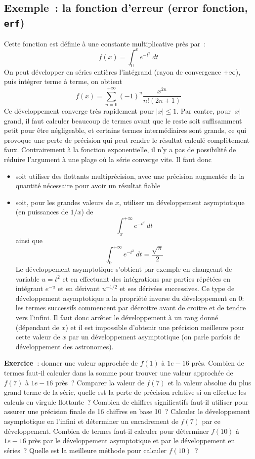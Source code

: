\documentclass[a4paper,11pt]{book}
\begin{document}
\begin{giacjshere}
\subsection{Exemple~: la fonction d'erreur (error fonction, {\tt
    erf})}
Cette fonction est définie à une constante multiplicative près par~:
\[ f(x)=\int_0^x e^{-t^2} \ dt \]
On peut développer en séries entières l'intégrand (rayon
de convergence $+\infty$), puis intégrer terme
à terme, on obtient
\[ f(x)= \sum_{n=0}^{+\infty} (-1)^n \frac{x^{2n}}{n! (2n+1)}\]
Ce développement converge très rapidement pour $|x|\leq 1$.
Par contre, pour $|x|$ grand, il faut calculer beaucoup de termes
avant que le reste soit suffisamment petit pour être négligeable,
et certains termes intermédiaires sont grands, ce qui provoque
une perte de précision qui peut rendre le résultat calculé
complètement faux. Contrairement à la fonction exponentielle,
il n'y a pas de possibilité de réduire l'argument à une plage
où la série converge vite. Il faut donc
\begin{itemize}
\item soit utiliser des flottants multiprécision, avec une précision
augmentée de la quantité nécessaire pour avoir un résultat fiable
\item soit, pour les grandes valeurs de $x$, utiliser un développement
asymptotique (en puissances de $1/x$) de
\[ \int_x^{+\infty} e^{-t^2} \ dt \]
ainsi que 
\[ \int_0^{+\infty} e^{-t^2} \ dt =\frac{\sqrt{\pi }}{2} \]
Le développement asymptotique
s'obtient par exemple en changeant de variable
$u=t^2$ et en effectuant des intégrations par parties répétées
en intégrant $e^{-u}$ et en dérivant $u^{-1/2}$ et ses dérivées
successives. Ce type de développement asymptotique a la propriété
inverse du développement en 0: les termes successifs commencent
par décroitre avant de croitre et de tendre vers l'infini. Il faut
donc arrêter le développement à un rang donné (dépendant de $x$)
et il est impossible d'obtenir une précision meilleure pour cette
valeur de $x$ par un développement asymptotique (on parle parfois de
développement des astronomes).
\end{itemize}

{\bf Exercice~}: donner une valeur approchée de $f(1)$ à $1e-16$ près.
Combien de termes faut-il calculer dans la somme pour trouver
une valeur approchée de $f(7)$ à $1e-16$ près~? Comparer la valeur
de $f(7)$ et la valeur absolue du plus grand terme de la série,
quelle est la perte de précision relative si on effectue les
calculs en virgule flottante~? Combien de chiffres significatifs
faut-il utiliser pour assurer une précision finale de 16 chiffres
en base 10~? Calculer le développement asymptotique en l'infini
et déterminer un encadrement de $f(7)$ par ce développement. Combien
de termes faut-il calculer pour déterminer $f(10)$ à $1e-16$ près
par le développement asymptotique et par le développement en séries~?
Quelle est la meilleure méthode pour calculer $f(10)$~?


\end{giacjshere}
\end{document}
